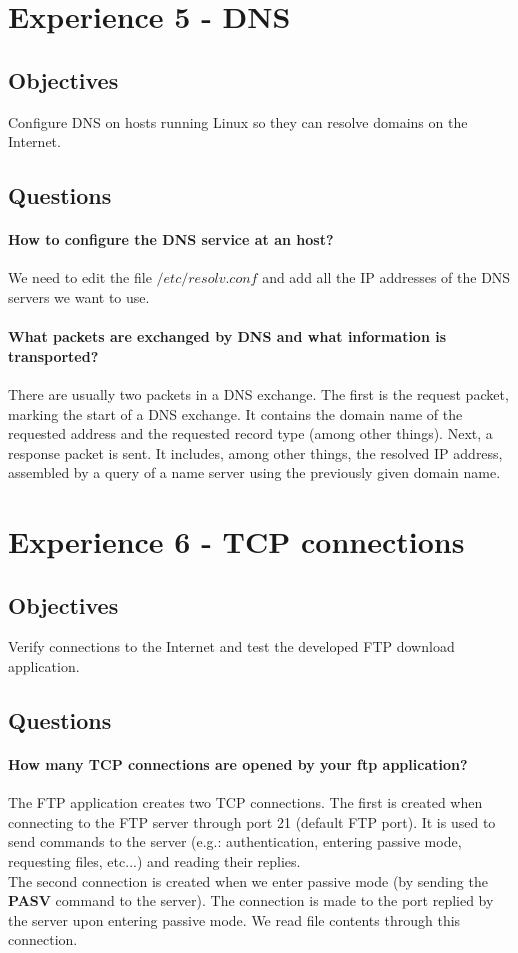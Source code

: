 \documentclass[11pt]{report}
\begin{document}
\section{Experience 5 - DNS}

\subsection{Objectives}
Configure DNS on hosts running Linux so they can resolve domains on the Internet.

\subsection{Questions}
\paragraph{How to configure the DNS service at an host?}
We need to edit the file $/etc/resolv.conf$ and add all the IP addresses of the DNS
servers we want to use.

\paragraph{What packets are exchanged by DNS and what information is transported?}
There are usually two packets in a DNS exchange. The first is the request packet,
marking the start of a DNS exchange. It contains the domain name of the requested
address and the requested record type (among other things). Next, a response packet
is sent. It includes, among other things, the resolved IP address, assembled
by a query of a name server using the previously given domain name.

\section{Experience 6 - TCP connections}

\subsection{Objectives}
Verify connections to the Internet and test the developed FTP download application.

\subsection{Questions}
\paragraph{How many TCP connections are opened by your ftp application?}
The FTP application creates two TCP connections. The first is created when connecting
to the FTP server through port 21 (default FTP port). It is used to send commands
to the server (e.g.: authentication, entering passive mode, requesting files, etc...)
and reading their replies.\\
The second connection is created when we enter passive mode (by sending the \textbf{PASV}
command to the server). The connection is made to the port replied by the server
upon entering passive mode. We read file contents through this connection.
\end{document}
